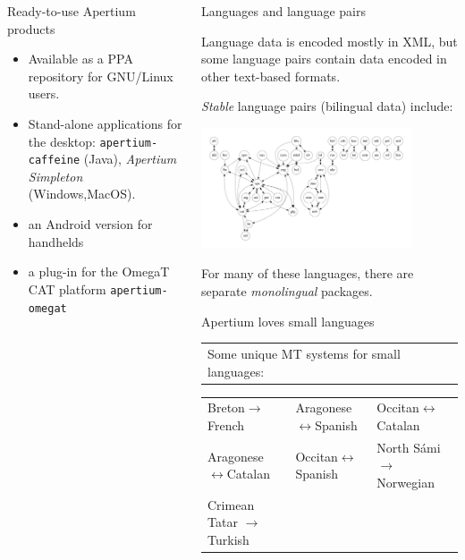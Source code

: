 \documentclass[final]{beamer} %
\newlength{\wideitemsep}
\let\olditem\item
\renewcommand{\item}{\setlength{\itemsep}{\wideitemsep}\olditem}
\begin{document}
\begin{frame}
\begin{columns}
\begin{column}{0.5\textwidth}
\begin{block}{Ready-to-use Apertium products}
\begin{itemize}\itemsep 0ex
  \item Available as a PPA repository for GNU/Linux users.
  \item Stand-alone applications for the desktop: \texttt{apertium-caffeine} (Java), \textit{Apertium Simpleton} (Windows,MacOS).
  \item an Android version for handhelds
  \item a plug-in for the OmegaT CAT platform \texttt{apertium-omegat}
\end{itemize}
\end{block}

\end{column}
\begin{column}{0.5\textwidth}

\begin{block}{Languages and language pairs}

Language data is encoded mostly in XML, but some language pairs contain data encoded in other text-based formats.

\emph{Stable} language pairs (bilingual data) include: 
\begin{center}
\includegraphics[width=0.82\textwidth]{Images/pairs.pdf}
\end{center}
For many of these languages, there are separate \textit{monolingual} packages.
\end{block}


\begin{block}{Apertium loves small languages}
\begin{tabular}{l}%
Some unique MT systems for small languages:
\end{tabular}
\begin{tabular}{lll}
Breton\(\to\)French & Aragonese\(\leftrightarrow\)Spanish & Occitan\(\leftrightarrow\)Catalan  \\
Aragonese\(\leftrightarrow\)Catalan & Occitan\(\leftrightarrow\)Spanish & North Sámi\(\to\)Norwegian \\
Crimean Tatar \(\to\) Turkish & ~ & ~ \\
\end{tabular}
\end{block}






\end{column}
\end{columns}
\end{frame}
\end{document}
